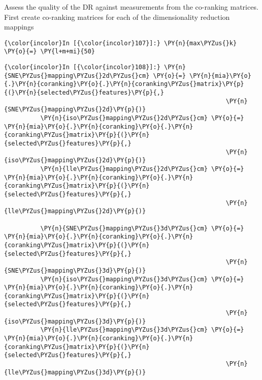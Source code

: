     Assess the quality of the DR against measurements from the co-ranking
matrices. First create co-ranking matrices for each of the
dimensionality reduction mappings

    \begin{Verbatim}[commandchars=\\\{\}]
{\color{incolor}In [{\color{incolor}107}]:} \PY{n}{max\PYZus{}k} \PY{o}{=} \PY{l+m+mi}{50}
\end{Verbatim}

    \begin{Verbatim}[commandchars=\\\{\}]
{\color{incolor}In [{\color{incolor}108}]:} \PY{n}{SNE\PYZus{}mapping\PYZus{}2d\PYZus{}cm} \PY{o}{=} \PY{n}{mia}\PY{o}{.}\PY{n}{coranking}\PY{o}{.}\PY{n}{coranking\PYZus{}matrix}\PY{p}{(}\PY{n}{selected\PYZus{}features}\PY{p}{,}
                                                             \PY{n}{SNE\PYZus{}mapping\PYZus{}2d}\PY{p}{)}
          \PY{n}{iso\PYZus{}mapping\PYZus{}2d\PYZus{}cm} \PY{o}{=} \PY{n}{mia}\PY{o}{.}\PY{n}{coranking}\PY{o}{.}\PY{n}{coranking\PYZus{}matrix}\PY{p}{(}\PY{n}{selected\PYZus{}features}\PY{p}{,}
                                                             \PY{n}{iso\PYZus{}mapping\PYZus{}2d}\PY{p}{)}
          \PY{n}{lle\PYZus{}mapping\PYZus{}2d\PYZus{}cm} \PY{o}{=} \PY{n}{mia}\PY{o}{.}\PY{n}{coranking}\PY{o}{.}\PY{n}{coranking\PYZus{}matrix}\PY{p}{(}\PY{n}{selected\PYZus{}features}\PY{p}{,}
                                                             \PY{n}{lle\PYZus{}mapping\PYZus{}2d}\PY{p}{)}

          \PY{n}{SNE\PYZus{}mapping\PYZus{}3d\PYZus{}cm} \PY{o}{=} \PY{n}{mia}\PY{o}{.}\PY{n}{coranking}\PY{o}{.}\PY{n}{coranking\PYZus{}matrix}\PY{p}{(}\PY{n}{selected\PYZus{}features}\PY{p}{,}
                                                             \PY{n}{SNE\PYZus{}mapping\PYZus{}3d}\PY{p}{)}
          \PY{n}{iso\PYZus{}mapping\PYZus{}3d\PYZus{}cm} \PY{o}{=} \PY{n}{mia}\PY{o}{.}\PY{n}{coranking}\PY{o}{.}\PY{n}{coranking\PYZus{}matrix}\PY{p}{(}\PY{n}{selected\PYZus{}features}\PY{p}{,}
                                                             \PY{n}{iso\PYZus{}mapping\PYZus{}3d}\PY{p}{)}
          \PY{n}{lle\PYZus{}mapping\PYZus{}3d\PYZus{}cm} \PY{o}{=} \PY{n}{mia}\PY{o}{.}\PY{n}{coranking}\PY{o}{.}\PY{n}{coranking\PYZus{}matrix}\PY{p}{(}\PY{n}{selected\PYZus{}features}\PY{p}{,}
                                                             \PY{n}{lle\PYZus{}mapping\PYZus{}3d}\PY{p}{)}
\end{Verbatim}

